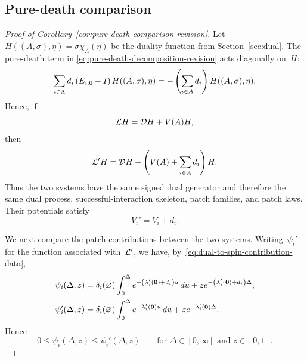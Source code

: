 \documentclass[EJP,preprint,NODS,nobera]{ejpecp}
\begin{document}
\subsection{Pure-death comparison}
\label{subsec:proof-pure-death-comparison}

\begin{proof}[Proof of Corollary~\ref{cor:pure-death-comparison-revision}]
Let~$H((A,\sigma),\eta)=\sigma\chi_A(\eta)$ be the duality function from
Section~\ref{sec:dual}. The pure-death term in
\eqref{eq:pure-death-decomposition-revision} acts diagonally on~$H$:
\begin{equation*}
\sum_{i\in\Lambda}d_i\left(E_{i,0}-I\right)H((A,\sigma),\eta)
=
-\left(\sum_{i\in A}d_i\right)H((A,\sigma),\eta).
\end{equation*}
Hence, if
\begin{equation*}
\mathcal{L} H
=
\mathcal{D} H+V(A)H,
\end{equation*}
then
\begin{equation*}
\mathcal{L}'H
=
\mathcal{D} H
+
\left(V(A)+\sum_{i\in A}d_i\right)H.
\end{equation*}
Thus the two systems have the same signed dual generator and therefore the same
dual process, successful-interaction skeleton, patch families, and
patch laws. Their potentials satisfy
\begin{equation}
\label{eq:pure-death-potential-comparison}
V_i'=V_i+d_i.
\end{equation}

We next compare the patch contributions between the two systems. Writing~$\psi_i'$ for the function associated with~$\mathcal{L}'$, we
have, by~\eqref{eq:dual-to-spin-contribution-data},
\begin{align*}
\psi_i(\Delta,z)
&=
\delta_i(\varnothing)
\int_0^\Delta
e^{-\left(\lambda_i'(\mathbf{0})+d_i\right)u}\,du
+
z e^{-\left(\lambda_i'(\mathbf{0})+d_i\right)\Delta},
\\
\psi_i'(\Delta,z)
&=
\delta_i(\varnothing)
\int_0^\Delta
e^{-\lambda_i'(\mathbf{0})u}\,du
+
z e^{-\lambda_i'(\mathbf{0})\Delta}.
\end{align*}
Hence
\begin{equation}
\label{eq:pure-death-psi-comparison}
0\leq\psi_i(\Delta,z)\leq\psi_i'(\Delta,z)
\qquad
\text{for }\Delta\in[0,\infty]\text{ and }z\in[0,1].
\end{equation}


\end{proof}
\end{document}
